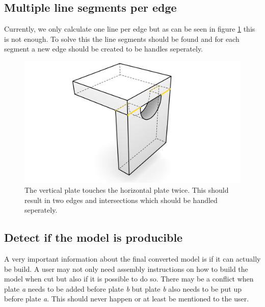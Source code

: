 \documentclass[../ClassicThesis.tex]{subfiles}
\begin{document}
\subsection{Multiple line segments per edge}
Currently, we only calculate one line per edge but as can be seen in figure \ref{fig:twoLineSegments} this is not enough. To solve this the line segments should be found and for each segment a new edge should be created to be handles seperately. 
\begin{figure}[!ht]
\centering
\includegraphics[width=\columnwidth]{Images/Blocks_two_contact.png}
\caption{The vertical plate touches the horizontal plate twice. This should result in two edges and intersections which should be handled seperately.}
\label{fig:twoLineSegments}
\end{figure}

\subsection{Detect if the model is producible}
A very important information about the final converted model is if it can actually be build. A user may not only need assembly instructions on how to build the model when cut but also if it is possible to do so. There may be a conflict when plate \emph{a} needs to be added before plate \emph{b} but plate \emph{b} also needs to be put up before plate \emph{a}. This should never happen or at least be mentioned to the user.
\end{document}
